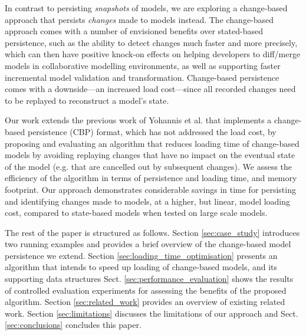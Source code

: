 \documentclass{llncs}
\begin{document}
In contrast to persisting \textit{snapshots} of models, we are exploring a change-based approach that persists \textit{changes} made to models instead. The change-based approach comes with a number of envisioned benefits over stated-based persistence, such as the ability to detect changes much faster and more precisely, which can then have positive knock-on effects on helping developers to diff/merge models in collaborative modelling environments, as well as supporting faster incremental model validation and transformation. Change-based persistence comes with a downside---an increased load cost---since all recorded changes need to be replayed to reconstruct a model's state.   

Our work extends the previous work of Yohannis et al. \cite{yohannis2017turning} that implements a change-based persistence (CBP) format, which has not addressed the load cost, by proposing and evaluating an algorithm that reduces loading time of change-based models by avoiding replaying changes that have no impact on the eventual state of the model (e.g. that are cancelled out by subsequent changes). We assess the efficiency of the algorithm in terms of persistence and loading time, and memory footprint. Our approach demonstrates considerable savings in time for persisting and identifying changes made to models, at a higher, but linear, model loading cost, compared to state-based models when tested on large scale models. %

The rest of the paper is structured as follows. Section \ref{sec:case_study} introduces two running examples and provides a brief overview of the change-based model persistence we extend. Section \ref{sec:loading_time_optimisation} presents an algorithm that intends to speed up loading of change-based models, and its supporting data structures %
Sect. \ref{sec:performance_evaluation} shows the results of controlled evaluation experiments for assessing the benefits of the proposed algorithm. Section \ref{sec:related_work} provides an overview of existing related work. Section \ref{sec:limitations} discusses the limitations of our approach and Sect. \ref{sec:conclusions} concludes this paper.
\end{document}
